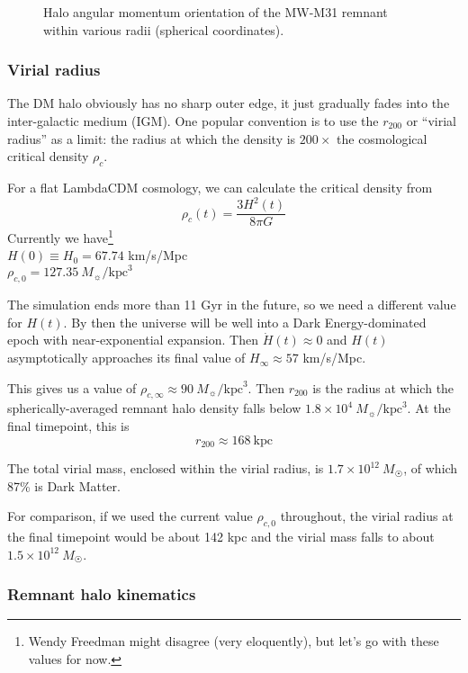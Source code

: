 \documentclass[twocolumn]{aastex63}
\newcommand{\todo}{\color{red}{TODO}\color{black}\hspace{2mm}}
\begin{document}
\begin{figure}[htb!]
	\caption{Halo angular momentum orientation of the MW-M31 remnant within various radii (spherical coordinates).
		\label{fig:rem_dm_phi_theta}}
\end{figure}
	
	

\subsubsection{Virial radius}

The DM halo obviously has no sharp outer edge, it just gradually fades into the inter-galactic medium (IGM). One popular convention is to use the $r_{200}$ or ``virial radius'' as a limit: the radius at which the density is $200\times$ the cosmological critical density $\rho_c$.

For a flat LambdaCDM cosmology, we can calculate the critical density from
\[ \rho_c(t) = \frac{3 H^2(t)}{8 \pi G} \] 
Currently \citep{planck_collaboration_planck_2016} we have\footnote{Wendy Freedman might disagree (very eloquently), but let's go with these values for now.} \\
$H(0) \equiv H_0 = 67.74$ km/s/Mpc \\
$\rho_{c,0} = 127.35\ M_\sun/\text{kpc}^3$

The simulation ends more than 11 Gyr in the future, so we need a different value for $H(t)$. By then the universe will be well into a Dark Energy-dominated epoch with near-exponential expansion. Then $\dot{H}(t) \approx 0$ and $H(t)$ asymptotically approaches its final value of $H_{\infty} \approx 57$ km/s/Mpc.

This gives us a value of $\rho_{c,\infty} \approx 90\ M_\sun/\text{kpc}^3$. Then $r_{200}$ is the radius at which the spherically-averaged remnant halo density falls below $1.8 \times 10^4\ M_\sun/\text{kpc}^3$. At the final timepoint, this is 
\[ r_{200} \approx 168\ \text{kpc} \]

The total virial mass, enclosed within the virial radius, is $1.7 \times 10^{12}\ M_\Sun$, of which 87\% is Dark Matter.

For comparison, if we used the current value $\rho_{c,0}$ throughout, the virial radius at the final timepoint would be about 142 kpc and the virial mass falls to about $1.5 \times 10^{12}\ M_\Sun$.

\todo{Some discussion would be useful!}

\subsubsection{Remnant halo kinematics}
\end{document}
